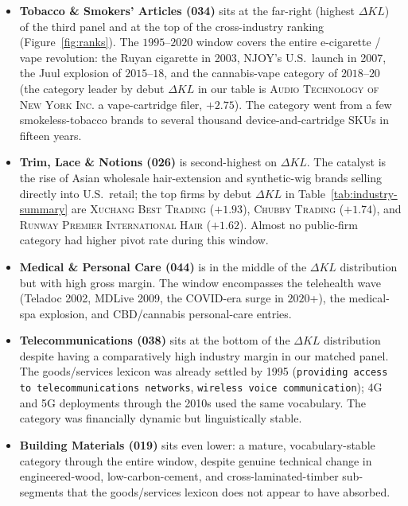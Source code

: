 \documentclass[11pt]{article}
\begin{document}
\begin{itemize}
  \item \textbf{Tobacco \& Smokers' Articles (034)} sits at the
        far-right (highest $\Delta KL$) of the third panel and at
        the top of the cross-industry ranking
        (Figure~\ref{fig:ranks}). The $1995$--$2020$ window covers
        the entire e-cigarette / vape revolution: the Ruyan
        cigarette in 2003, NJOY's U.S.\ launch in 2007, the Juul
        explosion of $2015$--$18$, and the cannabis-vape category
        of $2018$--$20$ (the category leader by debut $\Delta KL$
        in our table is \textsc{Audio Technology of New York Inc.}
        a vape-cartridge filer, $+2.75$). The category went from a
        few smokeless-tobacco brands to several thousand
        device-and-cartridge SKUs in fifteen years.

  \item \textbf{Trim, Lace \& Notions (026)} is second-highest on
        $\Delta KL$. The catalyst is the rise of Asian
        wholesale hair-extension and synthetic-wig brands selling
        directly into U.S.\ retail; the top firms by debut
        $\Delta KL$ in Table~\ref{tab:industry-summary} are
        \textsc{Xuchang Best Trading} ($+1.93$), \textsc{Chubby
        Trading} ($+1.74$), and \textsc{Runway Premier
        International Hair} ($+1.62$). Almost no public-firm
        category had higher pivot rate during this window.

  \item \textbf{Medical \& Personal Care (044)} is in the middle
        of the $\Delta KL$ distribution but with high gross
        margin. The window encompasses the telehealth wave
        (Teladoc 2002, MDLive 2009, the COVID-era surge in
        $2020$+), the medical-spa explosion, and CBD/cannabis
        personal-care entries.

  \item \textbf{Telecommunications (038)} sits at the bottom of
        the $\Delta KL$ distribution despite having a comparatively
        high industry margin in our matched panel. The
        goods/services lexicon was already settled by 1995
        (\texttt{providing access to telecommunications networks},
        \texttt{wireless voice communication}); 4G and 5G
        deployments through the 2010s used the same vocabulary.
        The category was financially dynamic but linguistically
        stable.

  \item \textbf{Building Materials (019)} sits even lower: a
        mature, vocabulary-stable category through the entire
        window, despite genuine technical change in
        engineered-wood, low-carbon-cement, and
        cross-laminated-timber sub-segments that the
        goods/services lexicon does not appear to have absorbed.
\end{itemize}
\end{document}
